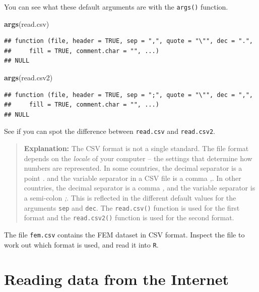 \documentclass[
]{book}
\newenvironment{Shaded}{\begin{snugshade}}{\end{snugshade}}
\newcommand{\FunctionTok}[1]{\textcolor[rgb]{0.13,0.29,0.53}{\textbf{#1}}}
\newcommand{\NormalTok}[1]{#1}
\begin{document}
You can see what these default arguments are with the \texttt{args()}
function.

\begin{Shaded}
\begin{Highlighting}[]
\FunctionTok{args}\NormalTok{(read.csv)}
\end{Highlighting}
\end{Shaded}

\begin{verbatim}
## function (file, header = TRUE, sep = ",", quote = "\"", dec = ".", 
##     fill = TRUE, comment.char = "", ...) 
## NULL
\end{verbatim}

\begin{Shaded}
\begin{Highlighting}[]
\FunctionTok{args}\NormalTok{(read.csv2)}
\end{Highlighting}
\end{Shaded}

\begin{verbatim}
## function (file, header = TRUE, sep = ";", quote = "\"", dec = ",", 
##     fill = TRUE, comment.char = "", ...) 
## NULL
\end{verbatim}

See if you can spot the difference between \texttt{read.csv} and
\texttt{read.csv2}.

\begin{quote}
\textbf{Explanation:} The CSV format is not a single standard. The
file format depends on the \emph{locale} of your computer -- the
settings that determine how numbers are represented. In some
countries, the decimal separator is a point \emph{.} and the variable
separator in a CSV file is a comma \emph{,}. In other countries, the
decimal separator is a comma \emph{,} and the variable separator is a
semi-colon \emph{;}. This is reflected in the different default values
for the arguments \texttt{sep} and \texttt{dec}. The
\texttt{read.csv()} function is used for the first format and the
\texttt{read.csv2()} function is used for the second format.
\end{quote}

The file \texttt{fem.csv} contains the FEM dataset in CSV format.
Inspect the file to work out which format is used, and read it into
\texttt{R}.

\section{Reading data from the Internet}\label{reading-data-from-the-internet}
\end{document}
